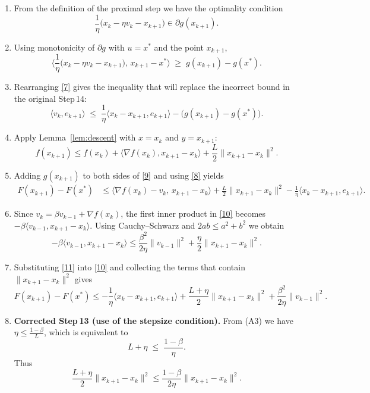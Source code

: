 \documentclass{article}
\begin{document}
\begin{enumerate}[label=[Step \arabic*], leftmargin=*]
\item From the definition of the proximal step we have the optimality condition
\[
\frac1\eta\bigl(x_{k}-\eta v_{k}-x_{k+1}\bigr)\in\partial g(x_{k+1}).
\tag{6}
\]

\item Using monotonicity of $\partial g$ with $u=x^{*}$ and the point $x_{k+1}$,
\[
\Big\langle \frac1\eta\bigl(x_{k}-\eta v_{k}-x_{k+1}\bigr),\,x_{k+1}-x^{*}\Big\rangle
\;\ge\; g(x_{k+1})-g(x^{*}).
\tag{7}
\]

\item Rearranging \eqref{7} gives the inequality that will replace the incorrect
bound in the original Step 14:
\[
\langle v_{k},e_{k+1}\rangle
\;\le\;
\frac1\eta\langle x_{k}-x_{k+1},e_{k+1}\rangle
      -\bigl(g(x_{k+1})-g(x^{*})\bigr).
\tag{8}
\]

\item Apply Lemma~\ref{lem:descent} with $x=x_{k}$ and $y=x_{k+1}$:
\[
f(x_{k+1})\le f(x_{k})+\langle\nabla f(x_{k}),x_{k+1}-x_{k}\rangle
          +\frac{L}{2}\|x_{k+1}-x_{k}\|^{2}.
\tag{9}
\]

\item Adding $g(x_{k+1})$ to both sides of \eqref{9} and using \eqref{8} yields
\[
\begin{aligned}
F(x_{k+1})-F(x^{*})
&\le \langle\nabla f(x_{k})-v_{k},\,x_{k+1}-x_{k}\rangle
     +\frac{L}{2}\|x_{k+1}-x_{k}\|^{2}
     -\frac1\eta\langle x_{k}-x_{k+1},e_{k+1}\rangle .
\end{aligned}
\tag{10}
\]

\item Since $v_{k}= \beta v_{k-1}+ \nabla f(x_{k})$, the first inner product in \eqref{10}
becomes $-\beta\langle v_{k-1},x_{k+1}-x_{k}\rangle$.  Using Cauchy–Schwarz and
$2ab\le a^{2}+b^{2}$ we obtain
\[
-\beta\langle v_{k-1},x_{k+1}-x_{k}\rangle
\le \frac{\beta^{2}}{2\eta}\|v_{k-1}\|^{2}
    +\frac{\eta}{2}\|x_{k+1}-x_{k}\|^{2}.
\tag{11}
\]

\item Substituting \eqref{11} into \eqref{10} and collecting the terms that contain
$\|x_{k+1}-x_{k}\|^{2}$ gives
\[
F(x_{k+1})-F(x^{*})
\le -\frac1\eta\langle x_{k}-x_{k+1},e_{k+1}\rangle
    +\frac{L+\eta}{2}\|x_{k+1}-x_{k}\|^{2}
    +\frac{\beta^{2}}{2\eta}\|v_{k-1}\|^{2}.
\tag{12}
\]

\item \textbf{Corrected Step 13 (use of the stepsize condition).}  
From (A3) we have $\eta\le\frac{1-\beta}{L}$, which is equivalent to
\[
L+\eta\;\le\;\frac{1-\beta}{\eta}.
\tag{13}
\]
Thus
\[
\frac{L+\eta}{2}\|x_{k+1}-x_{k}\|^{2}
\le \frac{1-\beta}{2\eta}\|x_{k+1}-x_{k}\|^{2}.
\tag{14}
\]


\end{enumerate}
\end{document}
